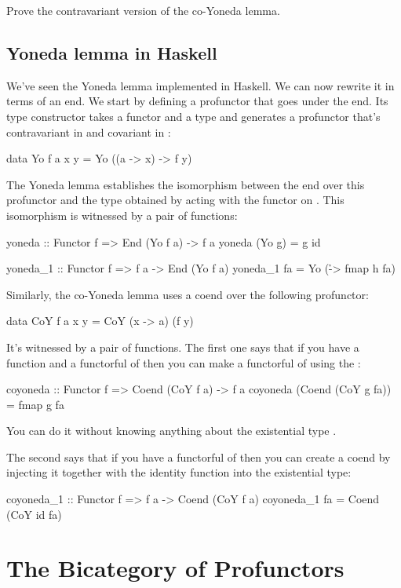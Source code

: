 \documentclass[DaoFP]{subfiles}
\begin{document}
\begin{exercise}
Prove the contravariant version of the co-Yoneda lemma.
\end{exercise}

\subsection{Yoneda lemma in Haskell}

We've seen the Yoneda lemma implemented in Haskell. We can now rewrite it in terms of an end. We start by defining a profunctor that goes under the end. Its type constructor takes a functor  and a type  and generates a profunctor that's contravariant in  and covariant in :
\begin{haskell}
data Yo f a x y = Yo ((a -> x) -> f y)
\end{haskell}
The Yoneda lemma establishes the isomorphism between the end over this profunctor and the type obtained by acting with the functor   on . This isomorphism is witnessed by a pair of functions:
\begin{haskell}
yoneda :: Functor f => End (Yo f a) -> f a
yoneda (Yo g) = g id

yoneda_1 :: Functor f => f a -> End (Yo f a)
yoneda_1 fa = Yo (\h -> fmap h fa)
\end{haskell}

Similarly, the co-Yoneda lemma uses a coend over the following profunctor:
\begin{haskell}
data CoY f a x y = CoY (x -> a) (f y)
\end{haskell}
It's witnessed by a pair of functions. The first one says that if you have a function  and a functorful of  then you can make a functorful of  using the :
\begin{haskell}
coyoneda :: Functor f => Coend (CoY f a) -> f a
coyoneda (Coend (CoY g fa)) = fmap g fa
\end{haskell}
You can do it without knowing anything about the existential type .

The second says that if you have a functorful of  then you can create a coend by injecting it together with the identity function into the existential type:
\begin{haskell}
coyoneda_1 :: Functor f => f a -> Coend (CoY f a)
coyoneda_1 fa = Coend (CoY id fa)
\end{haskell}


\section{The Bicategory of Profunctors}
\end{document}
